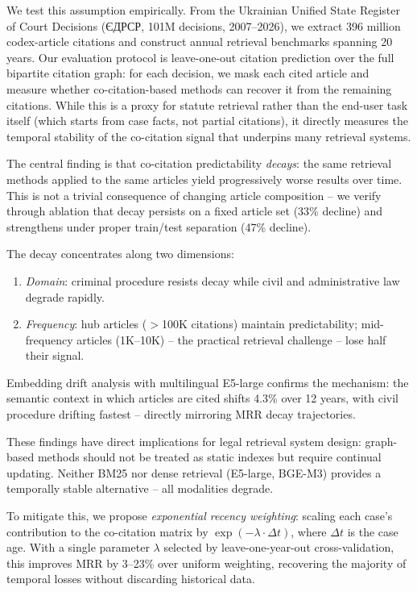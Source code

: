 \documentclass[11pt]{article}
\begin{document}
We test this assumption empirically.
From the Ukrainian Unified State Register of Court Decisions (\foreignlanguage{ukrainian}{ЄДРСР}, 101M decisions, 2007--2026), we extract 396 million codex-article citations and construct annual retrieval benchmarks spanning 20 years.
Our evaluation protocol is leave-one-out citation prediction over the full bipartite citation graph: for each decision, we mask each cited article and measure whether co-citation-based methods can recover it from the remaining citations.
While this is a proxy for statute retrieval rather than the end-user task itself (which starts from case facts, not partial citations), it directly measures the temporal stability of the co-citation signal that underpins many retrieval systems.

The central finding is that co-citation predictability \emph{decays}: the same retrieval methods applied to the same articles yield progressively worse results over time.
This is not a trivial consequence of changing article composition -- we verify through ablation that decay persists on a fixed article set (33\% decline) and strengthens under proper train/test separation (47\% decline).

The decay concentrates along two dimensions:
\begin{enumerate}[nosep,leftmargin=*]
  \item \emph{Domain}: criminal procedure resists decay while civil and administrative law degrade rapidly.
  \item \emph{Frequency}: hub articles ($>$100K citations) maintain predictability; mid-frequency articles (1K--10K) -- the practical retrieval challenge -- lose half their signal.
\end{enumerate}

Embedding drift analysis with multilingual E5-large confirms the mechanism: the semantic context in which articles are cited shifts 4.3\% over 12 years, with civil procedure drifting fastest -- directly mirroring MRR decay trajectories.

These findings have direct implications for legal retrieval system design: graph-based methods should not be treated as static indexes but require continual updating.
Neither BM25 nor dense retrieval (E5-large, BGE-M3) provides a temporally stable alternative -- all modalities degrade.

To mitigate this, we propose \emph{exponential recency weighting}: scaling each case's contribution to the co-citation matrix by $\exp(-\lambda \cdot \Delta t)$, where $\Delta t$ is the case age.
With a single parameter $\lambda$ selected by leave-one-year-out cross-validation, this improves MRR by 3--23\% over uniform weighting, recovering the majority of temporal losses without discarding historical data.
\end{document}

